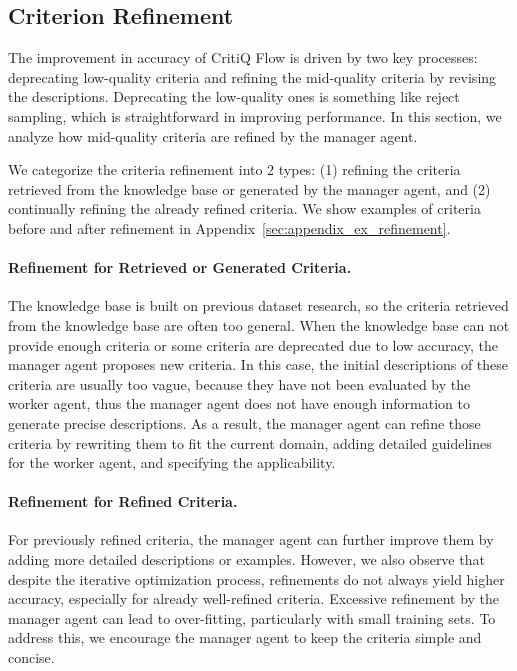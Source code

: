 \subsection{Criterion Refinement}
\label{sec:refinement}

The improvement in accuracy of CritiQ Flow is driven by two key processes:
deprecating low-quality criteria and refining the mid-quality criteria by
revising the descriptions. Deprecating the low-quality ones is something like reject
sampling, which is straightforward in improving performance. In this section, we
analyze how mid-quality criteria are refined by the manager agent.

We categorize the criteria refinement into 2 types: (1) refining the criteria retrieved
from the knowledge base or generated by the manager agent, and (2) continually
refining the already refined criteria. We show examples of criteria before and after
refinement in Appendix~\ref{sec:appendix_ex_refinement}.

\paragraph{Refinement for Retrieved or Generated Criteria.}
The knowledge base is built on previous dataset research, so the criteria retrieved
from the knowledge base are often too general. When the knowledge base can not
provide enough criteria or some criteria are deprecated due to low accuracy, the
manager agent proposes new criteria. In this case, the initial descriptions of these
criteria are usually too vague, because they have not been evaluated by the
worker agent, thus the manager agent does not have enough information to generate
precise descriptions. As a result, the manager agent can refine those criteria by
rewriting them to fit the current domain, adding detailed guidelines for the
worker agent, and specifying the applicability.

\paragraph{Refinement for Refined Criteria.}
For previously refined criteria, the manager agent can further improve them by adding
more detailed descriptions or examples. However, we also observe that despite the
iterative optimization process, refinements do not always yield higher accuracy,
especially for already well-refined criteria. Excessive refinement by the
manager agent can lead to over-fitting, particularly with small training sets.
To address this, we encourage the manager agent to keep the criteria simple and concise.

